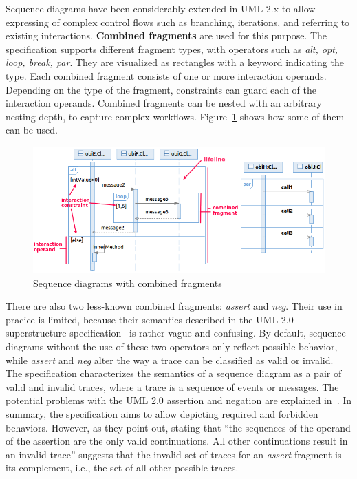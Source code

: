 \documentclass[letter]{llncs}
\begin{document}
Sequence diagrams have been considerably extended in UML 2.x to allow expressing of complex control 
flows such as branching, iterations, and referring to existing interactions.
\textbf{Combined fragments} are used for this purpose. The specification
supports different fragment types, with operators such as \emph{alt, opt, loop, break, par}. They are
visualized as rectangles with a keyword indicating the type.
Each combined fragment consists of one or more interaction operands. Depending
on the type of the fragment, constraints can guard each of the interaction operands. 
Combined fragments can be nested with an arbitrary nesting
depth, to capture complex workflows. Figure~\ref{fig:SDExample} shows how some of them can be
used. 
\begin{figure}[!t]
\centering
\includegraphics[width=1.0\linewidth,keepaspectratio=true]{./Figure2_merged.png}
\caption{Sequence diagrams with combined fragments}
\label{fig:SDExample}
\end{figure}
There are also two less-known combined fragments: \emph{assert} and \emph{neg}. Their use in pracice
is limited, because their semantics described in the UML 2.0 superstructure specification~\cite{UML2.4_superstructure}
is rather vague and confusing. By default, sequence diagrams without the use of these two operators 
only reflect possible behavior, while \emph{assert} and \emph{neg} alter the way 
a trace can be classified as valid or invalid. The specification characterizes
the semantics of a sequence diagram as a pair of valid and invalid traces,
where a trace is a sequence of events or messages.
The potential problems with the UML 2.0 assertion and negation are explained in~\cite{Harel07assertand}.
In summary, the specification aims to allow depicting required and forbidden behaviors.
However, as they point out, stating that ``the sequences of the operand of the assertion are the only valid continuations. All other continuations result in an invalid trace''
suggests that the invalid set of traces for an \emph{assert} fragment is its complement, i.e., the set of all other possible traces.
\end{document}
